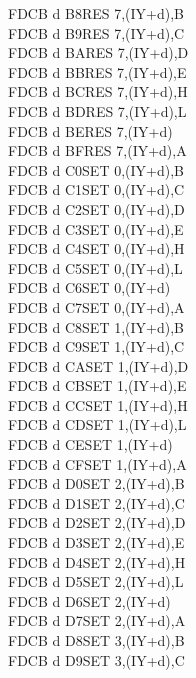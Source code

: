 \begin{multicols}{3}
{\begin{tabbing}
    FDCB d B8\>RES 7,(IY+d),B\UNDOC\\
    FDCB d B9\>RES 7,(IY+d),C\UNDOC\\
    FDCB d BA\>RES 7,(IY+d),D\UNDOC\\
    FDCB d BB\>RES 7,(IY+d),E\UNDOC\\
    FDCB d BC\>RES 7,(IY+d),H\UNDOC\\
    FDCB d BD\>RES 7,(IY+d),L\UNDOC\\
    FDCB d BE\>RES 7,(IY+d)\\
    FDCB d BF\>RES 7,(IY+d),A\UNDOC\\
    FDCB d C0\>SET 0,(IY+d),B\UNDOC\\
    FDCB d C1\>SET 0,(IY+d),C\UNDOC\\
    FDCB d C2\>SET 0,(IY+d),D\UNDOC\\
    FDCB d C3\>SET 0,(IY+d),E\UNDOC\\
    FDCB d C4\>SET 0,(IY+d),H\UNDOC\\
    FDCB d C5\>SET 0,(IY+d),L\UNDOC\\
    FDCB d C6\>SET 0,(IY+d)\\
    FDCB d C7\>SET 0,(IY+d),A\UNDOC\\
    FDCB d C8\>SET 1,(IY+d),B\UNDOC\\
    FDCB d C9\>SET 1,(IY+d),C\UNDOC\\
    FDCB d CA\>SET 1,(IY+d),D\UNDOC\\
    FDCB d CB\>SET 1,(IY+d),E\UNDOC\\
    FDCB d CC\>SET 1,(IY+d),H\UNDOC\\
    FDCB d CD\>SET 1,(IY+d),L\UNDOC\\
    FDCB d CE\>SET 1,(IY+d)\\
    FDCB d CF\>SET 1,(IY+d),A\UNDOC\\
    FDCB d D0\>SET 2,(IY+d),B\UNDOC\\
    FDCB d D1\>SET 2,(IY+d),C\UNDOC\\
    FDCB d D2\>SET 2,(IY+d),D\UNDOC\\
    FDCB d D3\>SET 2,(IY+d),E\UNDOC\\
    FDCB d D4\>SET 2,(IY+d),H\UNDOC\\
    FDCB d D5\>SET 2,(IY+d),L\UNDOC\\
    FDCB d D6\>SET 2,(IY+d)\\
    FDCB d D7\>SET 2,(IY+d),A\UNDOC\\
    FDCB d D8\>SET 3,(IY+d),B\UNDOC\\
    FDCB d D9\>SET 3,(IY+d),C\UNDOC\\

\end{tabbing}}
\end{multicols}
